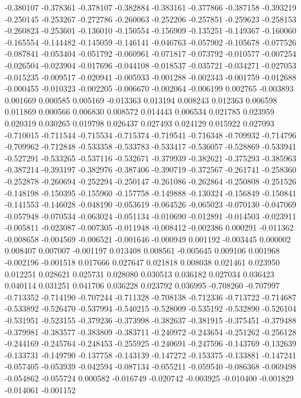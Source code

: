 -0.380107
-0.378361
-0.378107
-0.382884
-0.383161
-0.377866
-0.387158
-0.393219
-0.250145
-0.253267
-0.272786
-0.260063
-0.252206
-0.257851
-0.259623
-0.258153
-0.260823
-0.253601
-0.136010
-0.150554
-0.156909
-0.135251
-0.149367
-0.160060
-0.165554
-0.144482
-0.145059
-0.146141
-0.046763
-0.057902
-0.105678
-0.077526
-0.087841
-0.053404
-0.051792
-0.060961
-0.071817
-0.073792
-0.010577
-0.007254
-0.026504
-0.023904
-0.017696
-0.044108
-0.018537
-0.035721
-0.034271
-0.027053
-0.015235
-0.009517
-0.020941
-0.005933
-0.001288
-0.002343
-0.001759
-0.012688
-0.000455
-0.010323
-0.002205
-0.006670
-0.002064
-0.006199
0.002765
-0.003893
0.001669
0.000585
0.005169
-0.013363
0.013194
0.008243
0.012363
0.006598
0.011869
0.000566
0.006830
0.008572
0.014443
0.006534
0.021785
0.023959
0.020319
0.030265
0.019798
0.026437
0.027493
0.024129
0.015922
0.027093
-0.710015
-0.711544
-0.715534
-0.715374
-0.719541
-0.716348
-0.709932
-0.714796
-0.709962
-0.712848
-0.533358
-0.533783
-0.533417
-0.536057
-0.528869
-0.533941
-0.527291
-0.533265
-0.537116
-0.532671
-0.379939
-0.382621
-0.375293
-0.385963
-0.387214
-0.393197
-0.382976
-0.387406
-0.390719
-0.372567
-0.261741
-0.258360
-0.252878
-0.260694
-0.252294
-0.250147
-0.261086
-0.262864
-0.250808
-0.251526
-0.148198
-0.150395
-0.155960
-0.157758
-0.149888
-0.130324
-0.156849
-0.150841
-0.141553
-0.146028
-0.048190
-0.053619
-0.064526
-0.065023
-0.070130
-0.047069
-0.057948
-0.070534
-0.063024
-0.051134
-0.010690
-0.012891
-0.014503
-0.023911
-0.005811
-0.023087
-0.007305
-0.011948
-0.008412
-0.002386
0.000291
-0.011362
-0.008658
-0.004569
-0.006521
-0.001646
-0.000949
0.001192
-0.003445
0.000002
0.008407
0.007007
-0.001197
0.013408
0.008561
-0.005645
0.009106
0.001968
-0.002196
-0.001518
0.017666
0.027647
0.021818
0.008038
0.021461
0.023950
0.012251
0.028621
0.025731
0.028080
0.030513
0.036182
0.027034
0.036423
0.040114
0.031251
0.041706
0.036228
0.023792
0.036995
-0.708260
-0.707997
-0.713352
-0.714190
-0.707244
-0.711328
-0.708138
-0.712336
-0.713722
-0.714687
-0.533892
-0.526470
-0.537994
-0.540215
-0.528009
-0.535192
-0.532890
-0.526104
-0.531951
-0.523155
-0.379236
-0.373998
-0.382637
-0.381915
-0.375451
-0.379488
-0.379981
-0.383577
-0.383809
-0.383711
-0.240972
-0.243654
-0.251262
-0.256128
-0.244169
-0.245764
-0.248453
-0.255925
-0.240691
-0.247596
-0.143769
-0.132639
-0.133731
-0.149790
-0.137758
-0.143139
-0.147272
-0.153375
-0.133881
-0.147241
-0.057405
-0.053939
-0.042594
-0.087134
-0.055211
-0.059540
-0.086368
-0.069498
-0.054862
-0.055724
0.000582
-0.016749
-0.020742
-0.003925
-0.010400
-0.001829
-0.014061
-0.001152

